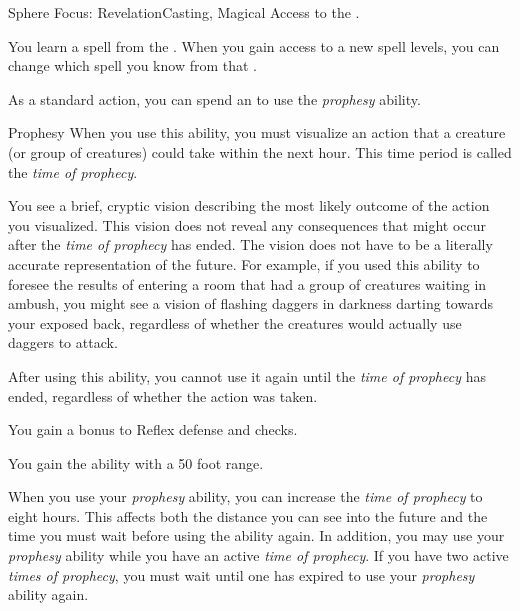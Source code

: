     \begin{feat}{Sphere Focus: Revelation}{Casting, Magical}
        \featpre Access to the  .

         You learn a spell from the  .
        When you gain access to a new spell levels, you can change which spell you know from that .

         As a standard action, you can spend an  to use the \textit{prophesy} ability.
        \begin{ability}{Prophesy}
            When you use this ability, you must visualize an action that a creature (or group of creatures) could take within the next hour.
            This time period is called the \textit{time of prophecy}.

            You see a brief, cryptic vision describing the most likely outcome of the action you visualized.
            This vision does not reveal any consequences that might occur after the \textit{time of prophecy} has ended.
            The vision does not have to be a literally accurate representation of the future.
            For example, if you used this ability to foresee the results of entering a room that had a group of creatures waiting in ambush, you might see a vision of flashing daggers in darkness darting towards your exposed back, regardless of whether the creatures would actually use daggers to attack.

            After using this ability, you cannot use it again until the \textit{time of prophecy} has ended, regardless of whether the action was taken.
        \end{ability}

         You gain a  bonus to Reflex defense and  checks.

         You gain the  ability with a 50 foot range.

         When you use your \textit{prophesy} ability, you can increase the \textit{time of prophecy} to eight hours.
        This affects both the distance you can see into the future and the time you must wait before using the ability again.
        In addition, you may use your \textit{prophesy} ability while you have an active \textit{time of prophecy}.
        If you have two active \textit{times of prophecy}, you must wait until one has expired to use your \textit{prophesy} ability again.


\end{feat}

